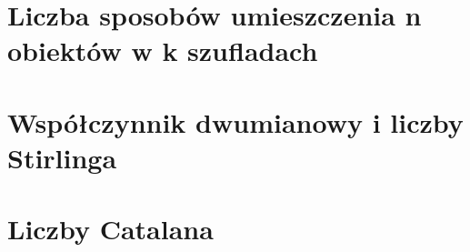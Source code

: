 \section{Liczba sposobów umieszczenia n obiektów w k szufladach}


\section{Współczynnik dwumianowy i liczby Stirlinga}


\section{Liczby Catalana}

